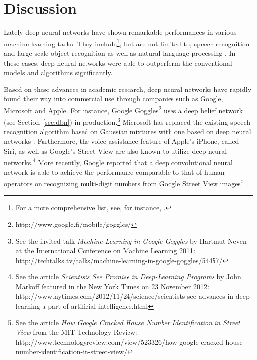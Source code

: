 \documentclass[dissertation,nocontribution]{aaltoseries}
\begin{document}
\chapter{Discussion}
\label{chap:discussion}

Lately deep neural networks have shown remarkable
performances in various machine learning tasks. They
include\footnote{For a more comprehensive list, see, for
instance, \citep{Bengio2013pami}.  }, but are not limited
to, speech recognition \citep[see,
e.g.,][]{Hinton2012sp,Dahl2012} and large-scale object
recognition \citep[see,
e.g.,][]{Goodfellow2013,Krizhevsky2012,Hinton2012} as well
as natural language processing \citep[see,
e.g.,][]{Socher2011}. In these cases, deep neural networks
were able to outperform the conventional models and
algorithms significantly.

Based on these advances in academic research, deep neural
networks have rapidly found their way into commercial use
through companies such as Google, Microsoft and Apple.  For
instance, Google Goggles\footnote{
http://www.google.fi/mobile/goggles/ } uses a deep belief
network (see Section~\ref{sec:dbn}) in
production.\footnote{See the invited talk \textit{Machine
Learning in Google Goggles} by Hartmut Neven at the
International Conference on Machine Learning 2011:
http://techtalks.tv/talks/machine-learning-in-google-goggles/54457/}
Microsoft has replaced the existing speech recognition
algorithm based on Gaussian mixtures with one based on deep
neural networks \citep{Deng2013}. Furthermore, the voice
assistance feature of Apple's iPhone, called Siri, as well
as Google's Street View are also known to utilize deep
neural networks.\footnote{See the article \textit{Scientists
See Promise in Deep-Learning Programs} by John Markoff
featured in the New York Times on 23 November 2012: \\
http://www.nytimes.com/2012/11/24/science/scientists-see-advances-in-deep-learning-a-part-of-artificial-intelligence.html
} More recently, Google reported that a deep convolutional
neural network is able to achieve the performance comparable
to that of human operators on recognizing multi-digit
numbers from Google Street View images\footnote{
See the article \textit{How Google Cracked House Number
Identification in Street View} from the MIT Technology
Review:
\\http://www.technologyreview.com/view/523326/how-google-cracked-house-number-identification-in-street-view/
}
\citep{Goodfellow2013}.
\end{document}
